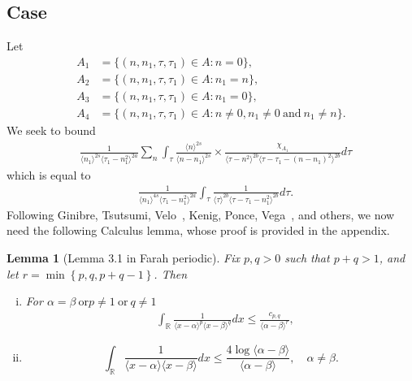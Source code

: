 \documentclass[12pt,reqno]{amsart}
\numberwithin{equation}{section}  %
\renewcommand{\cref}{\Cref}
\newcommand{\rr}{\mathbb{R}}
\newtheorem{lemma}[theorem]{Lemma}
\begin{document}
 \subsection{Case \cref{it-6}} 
\label{ssec:case-it-6}
Let 
%
%
\begin{align*}
A_1&=\{(n, n_1, \tau, \tau_1)\in A: n=0\},\\
A_2&=\{(n, n_1, \tau, \tau_1)\in A: n_1 = n \},\\
A_3&=\{(n, n_1, \tau, \tau_1)\in A: n_1=0 \},\\
A_4&=\{(n, n_1, \tau, \tau_1)\in A: n \neq 0, n_1 \neq 0 \ \text{and} \ n_1 \neq n \}.
\end{align*} 
%
%
%
We seek to bound
\begin{equation*}
\begin{split}
  & \frac{1}{\langle n_{1} \rangle ^{2s}
  \langle \tau_{1} - n_{1}^{2} \rangle
  ^{2a}} \sum_{n} \int_{\tau} \frac{\langle n \rangle ^{2s}}{\langle
  n - n_{1}\rangle ^{2s}}  \times \frac{\chi_{A_{1}}}{\langle
  \tau - n^{2}  \rangle^{2b}  \langle \tau - \tau_{1} - (n - n_{1})^{2}
  \rangle^{2b}} d \tau 
\end{split}
\end{equation*}
which is equal to 
%
\begin{equation}
  \label{case-1-term-1-reduc}
\begin{split}
  & \frac{1}{\langle n_{1} \rangle ^{4s}
  \langle \tau_{1} - n_{1}^{2} \rangle
  ^{2a}} \int_{\tau} \frac{1}{\langle
  \tau  \rangle^{2b}  \langle \tau - \tau_{1} - n_{1}^{2}
  \rangle^{2b}} d \tau.
\end{split}
\end{equation}
%
Following Ginibre, Tsutsumi, Velo~\cite{Ginibre:1997fk}, Kenig, Ponce, Vega~\cite{Kenig:1996aa}, and others,
we now need the following Calculus lemma, whose proof is provided in the
appendix.
%
%
%
%
%
%
%
\begin{lemma}[Lemma 3.1 in Farah periodic]
	\label{lem:calc}
 Fix $p, q > 0$ such that $p +q >1$, and let $r =\min\left\{p, q, p+q-1
 \right\}$. Then 
 \begin{enumerate}[(i)]
   \item
For $\alpha=\beta \ \text{or} p \neq 1 \ \text{or} \ q \neq 1$
 \begin{equation*}
\begin{split}
  & \int_{\rr} \frac{1}{\langle x - \alpha \rangle ^{p} \langle x -
  \beta \rangle
  ^{q}} d x
  \le \frac{c_{p,q}}{\langle \alpha - \beta \rangle ^{r}}, 
  \end{split}
\end{equation*}
  \item
    \begin{equation*}
  \int_{\rr} \frac{1}{\langle x - \alpha \rangle  \langle x - \beta
  \rangle} d x
  \le  \frac{4 \log \langle \alpha - \beta \rangle}{\langle \alpha - \beta
  \rangle}, \quad \alpha \neq \beta.
\end{equation*}
\end{enumerate}
\end{lemma}
\end{document}
